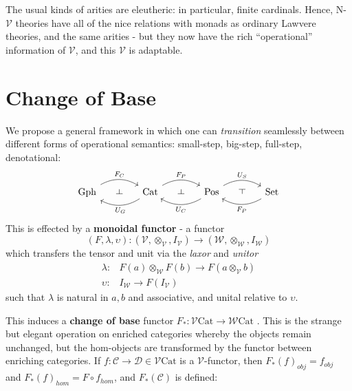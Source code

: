 \documentclass[a4paper,UKenglish]{article}
\theoremstyle{definition}
\def\rd{\rotatebox[origin=c]{90}{$\dashv$}} %
\def\ld{\rotatebox[origin=c]{-90}{$\dashv$}} %
\newcommand{\Gph}{\mathrm{Gph}}
\newcommand{\Set}{\mathrm{Set}}
\newcommand{\Cat}{\mathrm{Cat}}
\newcommand{\Pos}{\mathrm{Pos}}
\newcommand{\NN}{\mathrm{N}}
\newcommand{\V}{\mathscr{V}}
\newcommand{\W}{\mathscr{W}}
\newcommand{\D}{\mathscr{D}}
\newcommand{\C}{\mathscr{C}}
\begin{document}
The usual kinds of arities are eleutheric: in particular, finite cardinals. Hence, $\NN$-$\V$ theories have all of the nice relations with monads as ordinary Lawvere theories, and the same arities - but they now have the rich ``operational'' information of $\V$, and this $\V$ is adaptable.

\section{Change of Base}

We propose a general framework in which one can \textit{transition} seamlessly between different forms of operational semantics: small-step, big-step, full-step, denotational:
\[
\begin{tikzcd}[column sep=small]
\Gph \arrow[bend left,below]{rr}{F_C}
& \ld &
\arrow[bend left,above]{ll}{U_G} \Cat \arrow[bend left,below]{rr}{F_P}
& \ld &
\arrow[bend left,above]{ll}{U_C} \Pos \arrow[bend left,below]{rr}{U_S}
& \rd &
\Set \arrow[bend left,above]{ll}{F_P}
\end{tikzcd}
\]
This is effected by a \textbf{monoidal functor} - a functor $$(F,\lambda,\upsilon): (\V,\otimes_\V,I_\V) \to (\W,\otimes_\W,I_\W)$$ which transfers the tensor and unit via the \textit{laxor} and \textit{unitor}
\[\begin{array}{rl}
\lambda: & F(a) \otimes_\W F(b) \to F(a\otimes_\V b)\\
\upsilon: & I_\W \to F(I_\V)
\end{array}\]
such that $\lambda$ is natural in $a,b$ and associative, and unital relative to $\upsilon$.

This induces a \textbf{change of base} functor $F_*:\V\Cat \to \W\Cat$ \cite{borceux}. This is the strange but elegant operation on enriched categories whereby the objects remain unchanged, but the hom-objects are transformed by the functor between enriching categories. If $f: \C \to \D \in \V\Cat$ is a $\V$-functor, then $F_*(f)_{obj} = f_{obj}$ and $F_*(f)_{hom} = F\circ f_{hom}$, and $F_*(\C)$ is defined:
\end{document}
